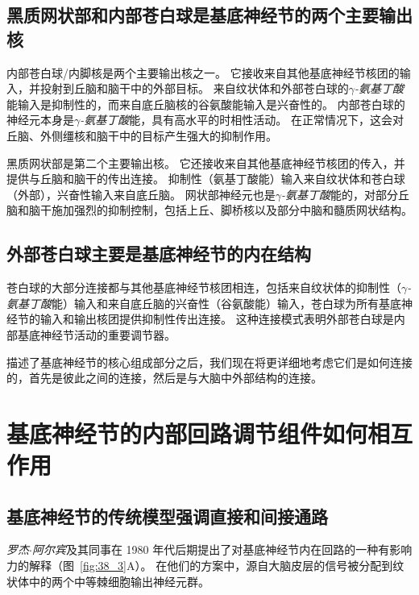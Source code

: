 \subsection{黑质网状部和内部苍白球是基底神经节的两个主要输出核}

内部苍白球/内脚核是两个主要输出核之一。
它接收来自其他基底神经节核团的输入，并投射到丘脑和脑干中的外部目标。
来自纹状体和外部苍白球的\textit{$\gamma$-氨基丁酸}能输入是抑制性的，而来自底丘脑核的谷氨酸能输入是兴奋性的。
内部苍白球的神经元本身是\textit{$\gamma$-氨基丁酸}能，具有高水平的时相性活动。
在正常情况下，这会对丘脑、外侧缰核和脑干中的目标产生强大的抑制作用。


黑质网状部是第二个主要输出核。
它还接收来自其他基底神经节核团的传入，并提供与丘脑和脑干的传出连接。
抑制性（氨基丁酸能）输入来自纹状体和苍白球（外部），兴奋性输入来自底丘脑。
网状部神经元也是\textit{$\gamma$-氨基丁酸}能的，对部分丘脑和脑干施加强烈的抑制控制，包括上丘、脚桥核以及部分中脑和髓质网状结构。



\subsection{外部苍白球主要是基底神经节的内在结构}

苍白球的大部分连接都与其他基底神经节核团相连，包括来自纹状体的抑制性（\textit{$\gamma$-氨基丁酸}能）输入和来自底丘脑的兴奋性（谷氨酸能）输入，苍白球为所有基底神经节的输入和输出核团提供抑制性传出连接。
这种连接模式表明外部苍白球是内部基底神经节活动的重要调节器。


描述了基底神经节的核心组成部分之后，我们现在将更详细地考虑它们是如何连接的，首先是彼此之间的连接，然后是与大脑中外部结构的连接。



\section{基底神经节的内部回路调节组件如何相互作用}

\subsection{基底神经节的传统模型强调直接和间接通路}

\textit{罗杰$\cdot$阿尔宾}及其同事在 1980 年代后期提出了对基底神经节内在回路的一种有影响力的解释（图~\ref{fig:38_3}A）。
在他们的方案中，源自大脑皮层的信号被分配到纹状体中的两个中等棘细胞输出神经元群。


